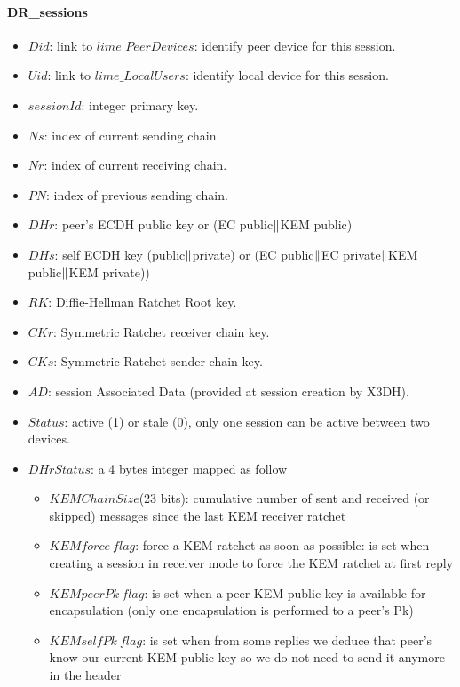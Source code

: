 \documentclass[a4paper,11pt]{article}
\begin{document}
    \paragraph*{DR\_sessions}
    \begin{itemize}
      \item $Did$: link to $lime\_PeerDevices$: identify peer device for this session.
      \item $Uid$: link to $lime\_LocalUsers$: identify local device for this session.
      \item $sessionId$: integer primary key.
      \item $Ns$: index of current sending chain.
      \item $Nr$: index of current receiving chain.
      \item $PN$: index of previous sending chain.
      \item $DHr$: peer's ECDH public key or (EC public$\Arrowvert $KEM public)
      \item $DHs$: self ECDH key (public$\Arrowvert $private) or  (EC public$\Arrowvert $EC private$\Arrowvert $KEM public$\Arrowvert $KEM private))
      \item $RK$: Diffie-Hellman Ratchet Root key.
      \item $CKr$: Symmetric Ratchet receiver chain key.
      \item $CKs$: Symmetric Ratchet sender chain key.
      \item $AD$: session Associated Data (provided at session creation by X3DH).
      \item $Status$: active (1) or stale (0), only one session can be active between two devices.
      \item $DHrStatus$: a 4 bytes integer mapped as follow
        \begin{itemize}
          \item $KEMChainSize$(23 bits): cumulative number of sent and received (or skipped) messages since the last KEM receiver ratchet
          \item $KEMforce\ flag$: force a KEM ratchet as soon as possible: is set when creating a session in receiver mode to force the KEM ratchet at first reply
          \item $KEM peer Pk\ flag$: is set when a peer KEM public key is available for encapsulation (only one encapsulation is performed to a peer's Pk)
          \item $KEM self Pk\ flag$: is set when from some replies we deduce that peer's know our current KEM public key so we do not need to send it anymore in the header

\end{itemize}
\end{itemize}
\end{document}
